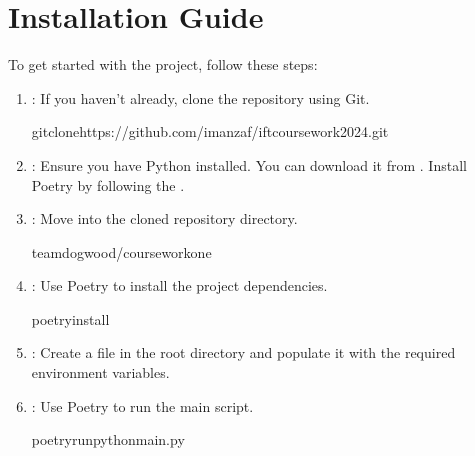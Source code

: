 \documentclass[letterpaper,10pt,english]{sphinxmanual}
\begin{document}
\chapter{Installation Guide}
\label{\detokenize{index:installation-guide}}
\sphinxAtStartPar
To get started with the project, follow these steps:
\begin{enumerate}
%
\item {} 
\sphinxAtStartPar
{}: If you haven’t already, clone the repository using Git.

\begin{sphinxVerbatim}[commandchars=\\\{\}]
gitclonehttps://github.com/imanzaf/ift\PYGZus{}coursework\PYGZus{}2024.git
\end{sphinxVerbatim}

\item {} 
\sphinxAtStartPar
{}:
\sphinxhyphen{} Ensure you have Python installed. You can download it from .
\sphinxhyphen{} Install Poetry by following the .

\item {} 
\sphinxAtStartPar
{}: Move into the cloned repository directory.

\begin{sphinxVerbatim}[commandchars=\\\{\}]
team\PYGZus{}dogwood/coursework\PYGZus{}one
\end{sphinxVerbatim}

\item {} 
\sphinxAtStartPar
{}: Use Poetry to install the project dependencies.

\begin{sphinxVerbatim}[commandchars=\\\{\}]
poetryinstall
\end{sphinxVerbatim}

\item {} 
\sphinxAtStartPar
{}: Create a  file in the root directory and populate it with the required environment variables.

\item {} 
\sphinxAtStartPar
{}: Use Poetry to run the main script.

\begin{sphinxVerbatim}[commandchars=\\\{\}]
poetryrunpythonmain.py
\end{sphinxVerbatim}

\end{enumerate}
\end{document}
